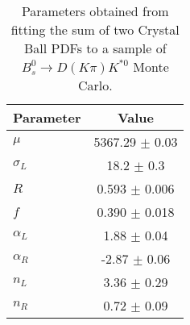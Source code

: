 \begin{table}[h]
  \centering
  \begin{tabular}{lc}
      \toprule
      Parameter & Value \\
      \midrule
      $\mu$ & 5367.29 $\pm$ 0.03 \\
      $\sigma_L$ & 18.2 $\pm$ 0.3 \\
      $R$ & 0.593 $\pm$ 0.006 \\
      $f$ & 0.390 $\pm$ 0.018 \\
      $\alpha_L$ & 1.88 $\pm$ 0.04 \\
      $\alpha_R$ & -2.87 $\pm$ 0.06 \\
      $n_L$ & 3.36 $\pm$ 0.29 \\
      $n_R$ & 0.72 $\pm$ 0.09 \\
  \bottomrule
  \end{tabular}
  \caption{Parameters obtained from fitting the sum of two Crystal Ball PDFs to a sample of $B^0_s \to D(K\pi)K^{*0}$ Monte Carlo.}
\label{tab:signal_Bs_MC_params}
\end{table}
